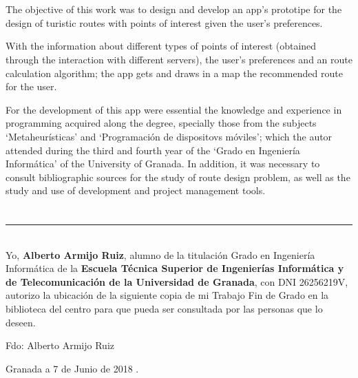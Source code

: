 \\

\vspace{0.7cm}
\\
The objective of this work was to design and develop an app's prototipe for the design of turistic routes with points of interest given the user's preferences.\newline

With the information about different types of points of interest (obtained through the interaction with different servers), the user's preferences and an route calculation algorithm; the app gets and draws in a map the recommended route for the user.\newline

For the development of this app were essential the knowledge and experience in programming acquired along the degree, specially those from the subjects \enquote*{Metaheurísticas} and \enquote*{Programación de dispositovs móviles}; which the autor attended during the third and fourth year of the \enquote*{Grado en Ingeniería Informática} of the University of Granada. In addition, it was necessary to consult bibliographic sources for the study of route design problem, as well as the study and use of development and project management tools.

\chapter*{}
\thispagestyle{empty}

\noindent\rule[-1ex]{\textwidth}{2pt}\\[4.5ex]

Yo, \textbf{Alberto Armijo Ruiz}, alumno de la titulación Grado en Ingeniería Informática de la \textbf{Escuela Técnica Superior
de Ingenierías Informática y de Telecomunicación de la Universidad de Granada}, con DNI 26256219V, autorizo la
ubicación de la siguiente copia de mi Trabajo Fin de Grado en la biblioteca del centro para que pueda ser
consultada por las personas que lo deseen.

\vspace{6cm}

\noindent Fdo: Alberto Armijo Ruiz

\vspace{2cm}

\begin{flushright}
Granada a 7 de Junio de 2018 .
\end{flushright}


